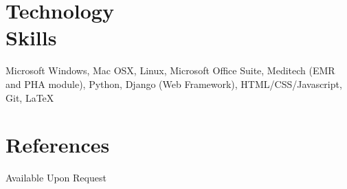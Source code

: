 \documentclass[margin,line]{resume}
\begin{document}
\begin{resume}



    \section{\mysidestyle Technology\\Skills} 

     Microsoft Windows, Mac OSX, Linux, Microsoft Office Suite, Meditech (EMR and PHA module), Python, Django (Web Framework), HTML/CSS/Javascript, Git, \LaTeX

%


    \section{\mysidestyle References} 
    
    Available Upon Request

%    
%
%

\end{resume}
\end{document}

